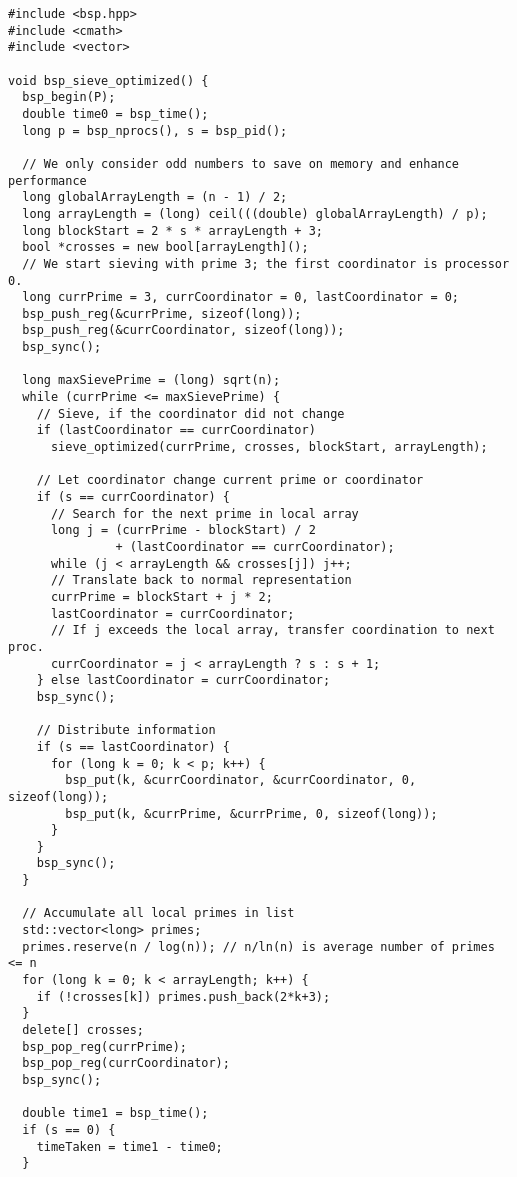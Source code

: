 \documentclass[a4paper,12pt]{article}
\begin{document}
	\begin{lstlisting}[caption={Optimized parallel program for the Sieve of Eratosthenes}, label={prg:par_opt_sieve}, frame={single}]
#include <bsp.hpp>
#include <cmath>
#include <vector>

void bsp_sieve_optimized() {
  bsp_begin(P);
  double time0 = bsp_time();
  long p = bsp_nprocs(), s = bsp_pid();

  // We only consider odd numbers to save on memory and enhance performance
  long globalArrayLength = (n - 1) / 2;
  long arrayLength = (long) ceil(((double) globalArrayLength) / p);
  long blockStart = 2 * s * arrayLength + 3;
  bool *crosses = new bool[arrayLength]();
  // We start sieving with prime 3; the first coordinator is processor 0.
  long currPrime = 3, currCoordinator = 0, lastCoordinator = 0;
  bsp_push_reg(&currPrime, sizeof(long));
  bsp_push_reg(&currCoordinator, sizeof(long));
  bsp_sync();

  long maxSievePrime = (long) sqrt(n);
  while (currPrime <= maxSievePrime) {
    // Sieve, if the coordinator did not change
    if (lastCoordinator == currCoordinator)
      sieve_optimized(currPrime, crosses, blockStart, arrayLength);

    // Let coordinator change current prime or coordinator
    if (s == currCoordinator) {
      // Search for the next prime in local array
      long j = (currPrime - blockStart) / 2
               + (lastCoordinator == currCoordinator);
      while (j < arrayLength && crosses[j]) j++;
      // Translate back to normal representation
      currPrime = blockStart + j * 2;
      lastCoordinator = currCoordinator;
      // If j exceeds the local array, transfer coordination to next proc.
      currCoordinator = j < arrayLength ? s : s + 1;
    } else lastCoordinator = currCoordinator;
    bsp_sync();

    // Distribute information
    if (s == lastCoordinator) {
      for (long k = 0; k < p; k++) {
        bsp_put(k, &currCoordinator, &currCoordinator, 0, sizeof(long));
        bsp_put(k, &currPrime, &currPrime, 0, sizeof(long));
      }
    }
    bsp_sync();
  }

  // Accumulate all local primes in list
  std::vector<long> primes;
  primes.reserve(n / log(n)); // n/ln(n) is average number of primes <= n
  for (long k = 0; k < arrayLength; k++) {
    if (!crosses[k]) primes.push_back(2*k+3);
  }
  delete[] crosses;
  bsp_pop_reg(currPrime);
  bsp_pop_reg(currCoordinator);
  bsp_sync();

  double time1 = bsp_time();
  if (s == 0) {
    timeTaken = time1 - time0;
  }
  

\end{lstlisting}
\end{document}
